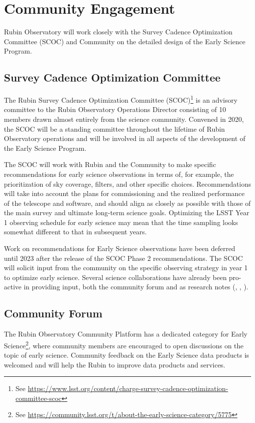 \section{Community Engagement}

Rubin Observatory will work closely with the Survey Cadence Optimization Committee (SCOC) and Community on the detailed design of the Early Science Program. 

\subsection{Survey Cadence Optimization Committee}
The Rubin Survey Cadence Optimization Committee (SCOC)\footnote{See \url{https://www.lsst.org/content/charge-survey-cadence-optimization-committee-scoc}} is an advisory committee to the Rubin Observatory Operations Director consisting of 10 members drawn almost entirely from the science community.
Convened in 2020, the SCOC will be a standing committee throughout the lifetime of Rubin Observatory operations and will be involved in all aspects of the development of the Early Science Program. 

The SCOC will work with Rubin and the Community to make specific recommendations for early science observations in terms of, for example, the prioritization of sky coverage, filters, and other specific choices. 
Recommendations will take into account the plans for commissioning and the realized performance of the telescope and software, and should align as closely as possible with those of the main survey and ultimate long-term science goals. 
Optimizing the LSST Year 1 observing schedule for early science may mean that the time sampling looks somewhat different to that in subsequent years. 

Work on recommendations for Early Science observations have been deferred until 2023 after the release of the SCOC Phase 2 recommendations.
The SCOC will solicit input from the community on the specific observing strategy in year 1 to optimize early science. 
Several science collaborations have already been pro-active in providing input,  both the community forum and as research notes (\citep{2020arXiv201005926L}, \citep{Hambleton_2020}, \citep{Street_2020}).


\subsection{Community Forum}

The Rubin Observatory Community Platform has a dedicated category for Early Science\footnote{See \url{https://community.lsst.org/t/about-the-early-science-category/5775}}, where community members are encouraged to open discussions on the topic of early science. 
Community feedback on the Early Science data products is welcomed and will help the Rubin to improve data products and services. 
